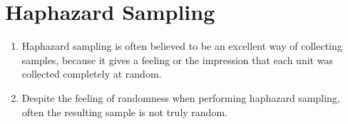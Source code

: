 \section{Haphazard Sampling \cite{statistics/book/Statistics-for-Data-Scientists/Maurits-Kaptein}}\label{Sampling Plans/Non-representative Sampling/Haphazard Sampling}

\begin{enumerate}
    \item Haphazard sampling is often believed to be an excellent way of collecting samples, because it gives a feeling or the impression that each unit was collected completely at random.
    \hfill \cite{statistics/book/Statistics-for-Data-Scientists/Maurits-Kaptein}

    \item Despite the feeling of randomness when performing haphazard sampling, often the resulting sample is not truly random.
    \hfill \cite{statistics/book/Statistics-for-Data-Scientists/Maurits-Kaptein}
\end{enumerate}
